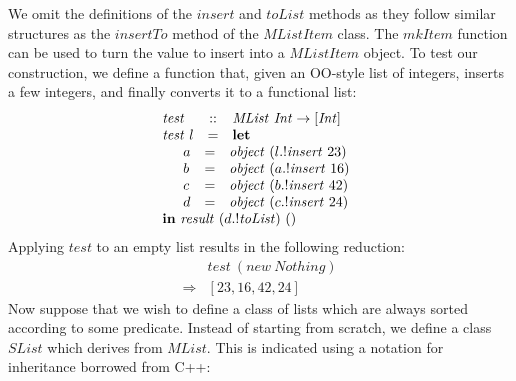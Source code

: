 We omit the definitions of the $\mathit{insert}$ and $\mathit{toList}$ methods as they follow similar structures as the $\mathit{insertTo}$ method of the $\mathit{MListItem}$ class. The $\mathit{mkItem}$ function can be used to turn the value to insert into a $\mathit{MListItem}$ object. To test our construction, we define a function that, given an OO-style list of integers, inserts a few integers, and finally converts it to a functional list:
\begin{displaymath}
\begin{array}{lcl}
\mathit{test} & :: & \mathit{MList}~\mathit{Int} \to [\mathit{Int}]\\
\mathit{test}~l & = & \mathbf{let} \\
\multicolumn{3}{l}{\quad \begin{array}{lcl}
    a & = & \mathit{object}~(l.!\mathit{insert}~23)\\
    b & = & \mathit{object}~(a.!\mathit{insert}~16)\\
    c & = & \mathit{object}~(b.!\mathit{insert}~42)\\
    d & = & \mathit{object}~(c.!\mathit{insert}~24)\\
    \end{array}}\\
\multicolumn{3}{l}{\mathbf{in}~\mathit{result}~(d.!\mathit{toList})~()}
\end{array}
\end{displaymath}
Applying $\mathit{test}$ to an empty list results in the following reduction:
\begin{displaymath}
\begin{array}{cl}
& \mathit{test}~(\mathit{new}~\mathit{Nothing}) \\
\Rightarrow & [23,16,42,24]
\end{array}
\end{displaymath}
Now suppose that we wish to define a class of lists which are always sorted according to some predicate. Instead of starting from scratch, we define a class $\mathit{SList}$ which derives from $\mathit{MList}$. This is indicated using a notation for inheritance borrowed from C++:

